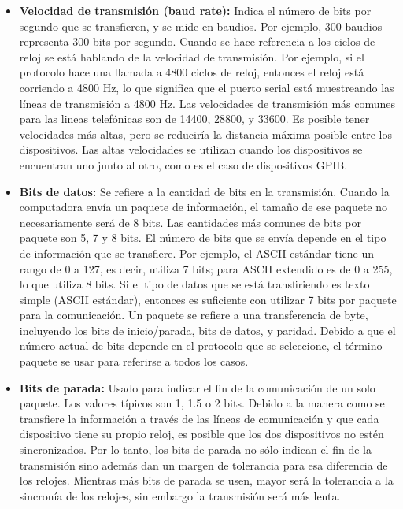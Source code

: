 \begin{itemize}
	\item \textbf{Velocidad de transmisión (baud rate):} Indica el número de bits por segundo que se transfieren, y se mide en baudios. Por ejemplo, 300 baudios representa 300 bits por segundo. Cuando se hace referencia a los ciclos de reloj se está hablando de la velocidad de transmisión. Por ejemplo, si el protocolo hace una llamada a 4800 ciclos de reloj, entonces el reloj está corriendo a 4800 Hz, lo que significa que el puerto serial está muestreando las líneas de transmisión a 4800 Hz. Las velocidades de transmisión más comunes para las lineas telefónicas son de 14400, 28800, y 33600. Es posible tener velocidades más altas, pero se reduciría la distancia máxima posible entre los dispositivos. Las altas velocidades se utilizan cuando los dispositivos se encuentran uno junto al otro, como es el caso de dispositivos GPIB.
	\item \textbf{Bits de datos:} Se refiere a la cantidad de bits en la transmisión. Cuando la computadora envía un paquete de información, el tamaño de ese paquete no necesariamente será de 8 bits. Las cantidades más comunes de bits por paquete son 5, 7 y 8 bits. El número de bits que se envía depende en el tipo de información que se transfiere. Por ejemplo, el ASCII estándar tiene un rango de 0 a 127, es decir, utiliza 7 bits; para ASCII extendido es de 0 a 255, lo que utiliza 8 bits. Si el tipo de datos que se está transfiriendo es texto simple (ASCII estándar), entonces es suficiente con utilizar 7 bits por paquete para la comunicación. Un paquete se refiere a una transferencia de byte, incluyendo los bits de inicio/parada, bits de datos, y paridad. Debido a que el número actual de bits depende en el protocolo que se seleccione, el término paquete se usar para referirse a todos los casos.
	\item \textbf{Bits de parada:} Usado para indicar el fin de la comunicación de un solo paquete. Los valores típicos son 1, 1.5 o 2 bits. Debido a la manera como se transfiere la información a través de las líneas de comunicación y que cada dispositivo tiene su propio reloj, es posible que los dos dispositivos no estén sincronizados. Por lo tanto, los bits de parada no sólo indican el fin de la transmisión sino además dan un margen de tolerancia para esa diferencia de los relojes. Mientras más bits de parada se usen, mayor será la tolerancia a la sincronía de los relojes, sin embargo la transmisión será más lenta.

\end{itemize}
